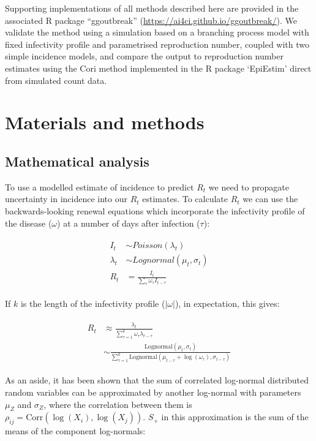 \documentclass[10pt,letterpaper]{article}
\begin{document}
Supporting implementations of all methods described here are provided in the associated R package ``ggoutbreak'' (\url{https://ai4ci.github.io/ggoutbreak/}). We validate the method using a simulation based on a branching process model with fixed infectivity profile and parametrised reproduction number, coupled with two simple incidence models, and compare the output to reproduction number estimates using the Cori method implemented in the R package `EpiEstim' \cite{thompson2019} direct from simulated count data.

\section*{Materials and methods}

\subsection*{Mathematical analysis}

To use a modelled estimate of incidence to predict $R_t$ we need to propagate uncertainty in incidence into our $R_t$ estimates. To calculate $R_t$ we can use the backwards-looking renewal equations \cite{gostic2020} which incorporate the infectivity profile of the disease ($\omega$) at a number of days after infection ($\tau$):

\begin{eqnarray}
\begin{aligned}
I_t &\sim Poisson(\lambda_t) \\
\lambda_t &\sim Lognormal(\mu_t,\sigma_t) \\
R_t &= \frac{I_t}{\sum_{\tau}{\omega_{\tau}I_{t-\tau}}}
\end{aligned}
\end{eqnarray}

If $k$ is the length of the infectivity profile ($|\omega|$), in expectation, this gives:

\begin{eqnarray}
\begin{aligned}
R_t &\approx \frac{\lambda_t}{\sum_{\tau=1}^{k} \omega_\tau \lambda_{t-\tau}} \\
&\sim \frac{\text{Lognormal}(\mu_t, \sigma_t)}{\sum_{\tau=1}^{k} \text{Lognormal}\left( \mu_{t-\tau} + \log( \omega_\tau), \sigma_{t-\tau} \right)}
\end{aligned}
\label{eq:renew}
\end{eqnarray}

As an aside, it has been shown that the sum of correlated log-normal distributed random variables can be approximated by another log-normal \cite{lo2013} with parameters $\mu_Z$ and $\sigma_Z$, where the correlation between them is $\rho_{ij} = \text{Corr}(\log(X_i), \log(X_j))$. $S_+$ in this approximation is the sum of the means of the component log-normals:
\end{document}
